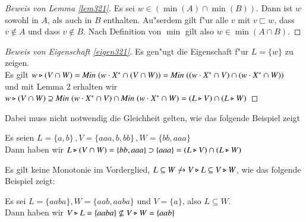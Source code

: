 \begin{proof}[Beweis von Lemma \ref{lem321}]
Es sei $w\in (\min(A) \cap \min(B))$. Dann ist $w$ sowohl in $A$, als auch in $B$ enthalten. Au"serdem gilt f"ur alle $v$ mit $v\sqsubset w$, dass $v \notin A$ und dass $v \notin B$. Nach Definition von $\min$ gilt also $w\in \min(A\cap B)$.\emph{}
\end{proof}
\begin{proof}[Beweis von Eigenschaft \ref{eigen321}]
Es gen"ugt die Eigenschaft f"ur $L=\{w\}$ zu zeigen.\\
Es gilt $w\triangleright (V\cap W) = \mathit{Min}\;(w\cdot X^* \cap (V \cap W))= \mathit{Min}\;((w\cdot X^* \cap V) \cap (w\cdot X^* \cap W))$\\
und mit Lemma 2 erhalten wir\\
$ w\triangleright (V\cap W) \supseteq \mathit{Min}\;(w\cdot X^* \cap V) \cap \mathit{Min}\;(w\cdot X^* \cap W)=(L\triangleright V) \cap (L\triangleright W)$
\end{proof}
Dabei muss nicht notwendig die Gleichheit gelten, wie das folgende Beispiel zeigt
\begin{beispiel}
Es seien $L= \{a,b\}\, ,V =\{aaa,b,bb\}\, ,W = \{bb,aaa\}$\\
Dann haben wir $L\triangleright (V\cap W) = \{bb,aaa\} \supset \{ aaa \} =(L\triangleright V) \cap (L\triangleright W)$
\end{beispiel}

Es gilt keine Monotonie im Vorderglied, $L\subseteq W \not\to V\triangleright L \subseteq V \triangleright W$, wie das folgende Beispiel zeigt:
\begin{beispiel}
Es sei $L=\{aaba\},W=\{aab,aaba\}$ und $V=\{a\}$, also $L\subseteq W$.\\
Dann haben wir $V\triangleright L = \{aaba\} \not\subseteq V\triangleright W =\{aab\}$
\end{beispiel}





\newpage
